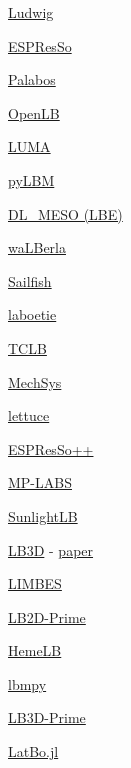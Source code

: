 \documentclass[t,12pt,numbers,fleqn]{beamer}
\begin{document}
\begin{frame}
\begin{multicols}{2}	
	\bi
			\item \href{https://ludwig.epcc.ed.ac.uk/}{Ludwig}
			\item \href{http://espressomd.org/wordpress/}{ESPResSo}
			\item \href{https://palabos.unige.ch/}{Palabos}
			\item \href{https://www.openlb.net/}{OpenLB}
			\item \href{https://github.com/aharwood2/LUMA/}{LUMA}
			\item \href{https://pypi.org/project/pylbm/}{pyLBM}
			\item \href{https://www.scd.stfc.ac.uk/Pages/DL_MESO.aspx}{DL\_MESO (LBE)}
			\item \href{https://www.walberla.net}{waLBerla}
			\item \href{http://sailfish.us.edu.pl/}{Sailfish}
			\item \href{https://github.com/maxlevesque/laboetie}{laboetie}
			\item \href{https://docs.tclb.io/}{TCLB}
			\item \href{http://mechsys.nongnu.org/}{MechSys}
			\item \href{https://github.com/Olllom/lettuce}{lettuce}
			\item \href{https://github.com/espressopp/espressopp}{ESPResSo++} 
			\item \href{https://github.com/carlosrosales/mplabs}{MP-LABS}		
			\item \href{http://sunlightlb.sourceforge.net/}{SunlightLB}
			\item \href{http://ccs.chem.ucl.ac.uk/lb3d}{LB3D} - 			
			\href{https://www.sciencedirect.com/science/article/pii/S0010465517301017}{paper}
			\item \href{https://code.google.com/archive/p/limbes/}{LIMBES}
			\item \href{http://faculty.fiu.edu/~sukopm/LBnD_Prime/LBnD_Prime.html}{LB2D-Prime}	
			\item \href{https://github.com/UCL/hemelb}{HemeLB} 
			\item \href{https://pypi.org/project/lbmpy/}{lbmpy}	
			\item \href{http://faculty.fiu.edu/~sukopm/LBnD_Prime/LBnD_Prime.html}{LB3D-Prime}	
			\item \href{https://github.com/UCL/LatBo.jl}{LatBo.jl}
	\ei
\end{multicols}

\end{frame}
\end{document}
